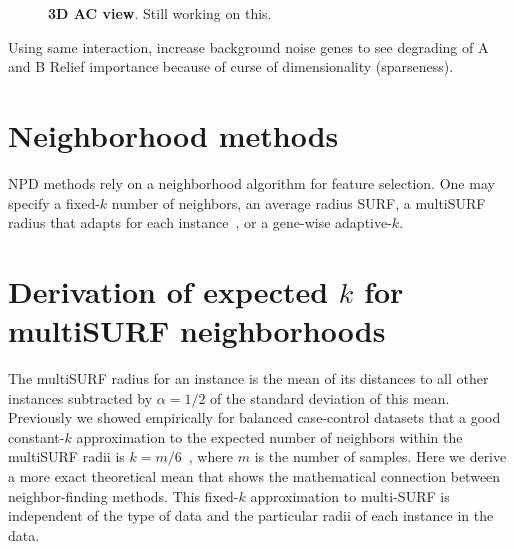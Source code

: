 \documentclass[10pt,letterpaper]{article}\usepackage[]{graphicx}\usepackage[]{color}
\begin{document}
\begin{figure}[ht!]
\begin{minipage}[c]{0.4\textheight}
\centering
\end{minipage} \hspace{-0.4cm}
\begin{minipage}[c]{0.5\textwidth}
\centering
\caption{{\bf 3D AC view}. Still working on this. }\label{fig:3d_d}
\end{minipage}
\end{figure}  
Using same interaction, increase background noise genes to see degrading of A and B Relief importance because of curse of dimensionality (sparseness). 

\section{Neighborhood methods}
NPD methods rely on a neighborhood algorithm for feature selection. One may specify a fixed-$k$ number of neighbors, an average radius SURF, a multiSURF radius that adapts for each instance~\cite{urbanowicz17}, or a gene-wise adaptive-$k$. 

\section{Derivation of expected $k$ for multiSURF neighborhoods}
The multiSURF radius for an instance is the mean of its distances to all other instances subtracted by $\alpha=1/2$ of the standard deviation of this mean. Previously we showed empirically for balanced case-control datasets that a good constant-$k$ approximation to the expected number of neighbors within the multiSURF radii is $k=m/6$~\cite{stir}, where $m$ is the number of samples. Here we derive a more exact theoretical mean that shows the mathematical connection between neighbor-finding methods. This fixed-$k$ approximation to multi-SURF is independent of the type of data and the particular radii of each instance in the data.
%
\end{document}
